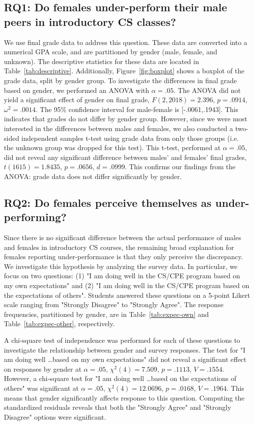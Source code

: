 \documentclass[a4paper,man,natbib]{apa6}
\begin{document}
\subsection{RQ1: Do females under-perform their male peers in introductory CS classes?}
We use final grade data to address this question. These data are converted into a
numerical GPA scale, and are partitioned by gender (male, female, and unknown).
The descriptive statistics for these data are located in Table~\ref{tab:descriptive}.
Additionally, Figure~\ref{fig:boxplot} shows a boxplot of the grade data, split
by gender group. To investigate the differences in final grade based on gender,
we performed an ANOVA with $\alpha = .05$. The ANOVA did not yield a
significant effect of gender on final grade, $F(2,2018)=2.396$, $p=.0914$,
$\omega^2=.0014$. The 95\% confidence interval for male-female is
[-.0061,.1943]. This indicates that grades do not differ by gender group.
However, since we were most interested in the differences between males and
females, we also conducted a two-sided independent samples t-test using grade data from
only those groups (i.e. the unknown group was dropped for this test). This
t-test, performed at $\alpha=.05$, did not reveal any significant difference
between males' and females' final grades, $t(1615)=1.8435$, $p=.0656$,
$d=.0999$. This confirms our findings from the ANOVA: grade data does not
differ significantly by gender.

\subsection{RQ2: Do females perceive themselves as under-performing?}
Since there is no significant difference between the actual performance of
males and females in introductory CS courses, the remaining broad explanation
for females reporting under-performance is that they only perceive the
discrepancy. We investigate this hypothesis by analyzing the survey data. In
particular, we focus on two questions: (1) "I am doing well in the CS/CPE
program based on my own expectations" and (2) "I am doing well in the CS/CPE
program based on the expectations of others". Students answered these questions
on a 5-point Likert scale ranging from "Strongly Disagree" to "Strongly Agree".
The response frequencies, partitioned by gender, are in
Table~\ref{tab:expec-own} and Table~\ref{tab:expec-other}, respectively. 

A chi-square test of independence was performed for each of these questions to
investigate the relationship between gender and survey responses. The test for
"I am doing well \dots based on my own expectations" did not reveal a
significant effect on responses by gender at $\alpha=.05$, $\chi^2(4)=7.509$,
$p=.1113$, $V=.1554$. However, a chi-square test for "I am doing well \dots based on the
expectations of others" was significant at $\alpha=.05$, $\chi^2(4)=12.0696$,
$p=.0168$, $V=.1964$. This means that gender significantly affects response to this
question. Computing the standardized residuals reveals that both the "Strongly
Agree" and "Strongly Disagree" options were significant. 
\end{document}
